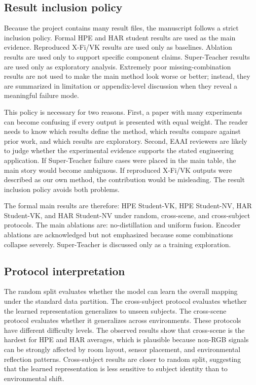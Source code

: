 \documentclass[preprint,12pt]{elsarticle}
\begin{document}
\subsection{Result inclusion policy}

Because the project contains many result files, the manuscript follows a strict inclusion policy. Formal HPE and HAR student results are used as the main evidence. Reproduced X-Fi/VK results are used only as baselines. Ablation results are used only to support specific component claims. Super-Teacher results are used only as exploratory analysis. Extremely poor missing-combination results are not used to make the main method look worse or better; instead, they are summarized in limitation or appendix-level discussion when they reveal a meaningful failure mode.

This policy is necessary for two reasons. First, a paper with many experiments can become confusing if every output is presented with equal weight. The reader needs to know which results define the method, which results compare against prior work, and which results are exploratory. Second, EAAI reviewers are likely to judge whether the experimental evidence supports the stated engineering application. If Super-Teacher failure cases were placed in the main table, the main story would become ambiguous. If reproduced X-Fi/VK outputs were described as our own method, the contribution would be misleading. The result inclusion policy avoids both problems.

The formal main results are therefore: HPE Student-VK, HPE Student-NV, HAR Student-VK, and HAR Student-NV under random, cross-scene, and cross-subject protocols. The main ablations are: no-distillation and uniform fusion. Encoder ablations are acknowledged but not emphasized because some combinations collapse severely. Super-Teacher is discussed only as a training exploration.

\subsection{Protocol interpretation}

The random split evaluates whether the model can learn the overall mapping under the standard data partition. The cross-subject protocol evaluates whether the learned representation generalizes to unseen subjects. The cross-scene protocol evaluates whether it generalizes across environments. These protocols have different difficulty levels. The observed results show that cross-scene is the hardest for HPE and HAR averages, which is plausible because non-RGB signals can be strongly affected by room layout, sensor placement, and environmental reflection patterns. Cross-subject results are closer to random split, suggesting that the learned representation is less sensitive to subject identity than to environmental shift.
\end{document}

